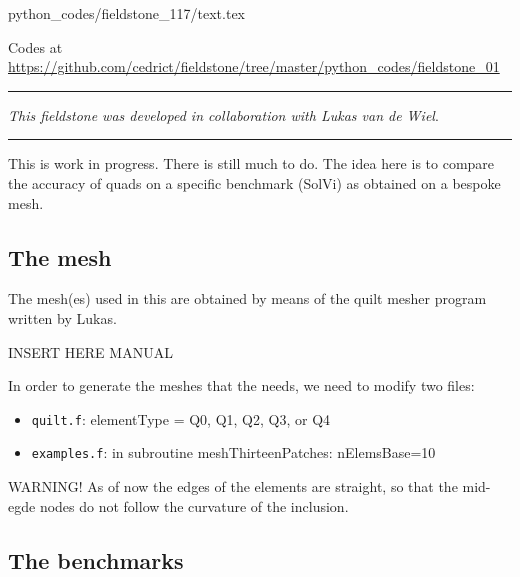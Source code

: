 \begin{flushright} {\tiny {\color{gray} python\_codes/fieldstone\_117/text.tex}} \end{flushright}



\begin{center}

Codes at \url{https://github.com/cedrict/fieldstone/tree/master/python_codes/fieldstone_01}
\end{center}

\par\noindent\rule{\textwidth}{0.4pt}

{\sl This fieldstone was developed in collaboration with Lukas van de Wiel}. 

\par\noindent\rule{\textwidth}{0.4pt}

This is work in progress. There is still much to do. The idea here is to compare the 
accuracy of quads on a specific benchmark (SolVi) as obtained on a bespoke mesh.

\subsection*{The mesh}

The mesh(es) used in this \stone are obtained by means of the quilt mesher program written by Lukas. 

INSERT HERE MANUAL


In order to generate the meshes that the \stone needs, we need to modify two files:
\begin{itemize}
\item {\tt quilt.f}: elementType = Q0, Q1, Q2, Q3, or Q4
\item {\tt examples.f}: in subroutine meshThirteenPatches: nElemsBase=10
\end{itemize}

WARNING! As of now the edges of the elements are straight, so that the mid-egde nodes do not 
follow the curvature of the inclusion.

\subsection*{The benchmarks}

